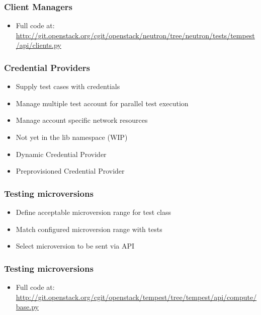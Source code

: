 \documentclass[aspectratio=169,11pt,hyperref={colorlinks=true}]{beamer}
\begin{document}
\begin{frame}
    \frametitle{Client Managers}
     
    \begin{itemize}
        \item \tiny Full code at: \href{http://git.openstack.org/cgit/openstack/neutron/tree/neutron/tests/tempest/api/clients.py}{http://git.openstack.org/cgit/openstack/neutron/tree/neutron/tests/tempest/api/clients.py}
    \end{itemize}
\end{frame}

\begin{frame}
    \frametitle{Credential Providers}
    \begin{itemize}
        \item Supply test cases with credentials
        \item Manage multiple test account for parallel test execution
        \item Manage account specific network resources
        \item Not yet in the lib namespace (WIP)
    \end{itemize}
    \begin{itemize}
        \item Dynamic Credential Provider
        \item Preprovisioned Credential Provider
    \end{itemize}
\end{frame}

\begin{frame}
    \frametitle{Testing microversions}
    \begin{itemize}
        \item Define acceptable microversion range for test class
        \item Match configured microversion range with tests
        \item Select microversion to be sent via API
    \end{itemize}
\end{frame}

\begin{frame}
    \frametitle{Testing microversions}
    
    \begin{itemize}
        \item \tiny Full code at: \href{http://git.openstack.org/cgit/openstack/tempest/tree/tempest/api/compute/base.py}{http://git.openstack.org/cgit/openstack/tempest/tree/tempest/api/compute/base.py}
    \end{itemize}
\end{frame}
\end{document}
